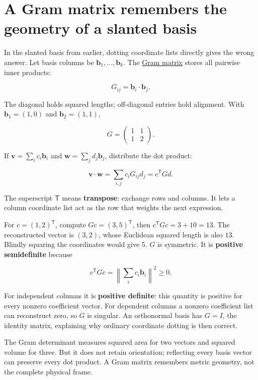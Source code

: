 \section{A Gram matrix remembers the geometry of a slanted basis}\label{01-foundations-i-ch018-a-gram-matrix-remembers-the-geometry-of-a-slanted-basis}

In the slanted basis from earlier, dotting coordinate lists directly gives the wrong answer. Let basis columns be \(\mathbf b_1,\ldots,\mathbf b_k\). The \hyperref[01-foundations-i-ch018-a-gram-matrix-remembers-the-geometry-of-a-slanted-basis]{Gram matrix} stores all pairwise inner products:

\[
G_{ij}=\mathbf b_i\cdot\mathbf b_j.
\]

The diagonal holds squared lengths; off-diagonal entries hold alignment. With \(\mathbf b_1=(1,0)\) and \(\mathbf b_2=(1,1)\),

\[
G=\begin{pmatrix}1&1\\1&2\end{pmatrix}.
\]

If \(\mathbf v=\sum_i c_i\mathbf b_i\) and \(\mathbf w=\sum_jd_j\mathbf b_j\), distribute the dot product:

\[
\mathbf v\cdot\mathbf w
=\sum_{i,j}c_iG_{ij}d_j=c^\mathsf TGd.
\]

The superscript \(\mathsf T\) means \textbf{transpose}: exchange rows and columns. It lets a column coordinate list act as the row that weights the next expression.

For \(c=(1,2)^\mathsf T\), compute \(Gc=(3,5)^\mathsf T\), then \(c^\mathsf TGc=3+10=13\). The reconstructed vector is \((3,2)\), whose Euclidean squared length is also \(13\). Blindly squaring the coordinates would give \(5\). \(G\) is symmetric. It is \textbf{positive semidefinite} because

\[
c^\mathsf TGc=\left\|\sum_i c_i\mathbf b_i\right\|^2\ge0.
\]

For independent columns it is \textbf{positive definite}: this quantity is positive for every nonzero coefficient vector. For dependent columns a nonzero coefficient list can reconstruct zero, so \(G\) is singular. An orthonormal basis has \(G=I\), the identity matrix, explaining why ordinary coordinate dotting is then correct.

The Gram determinant measures squared area for two vectors and squared volume for three. But it does not retain orientation; reflecting every basis vector can preserve every dot product. A Gram matrix remembers metric geometry, not the complete physical frame.

